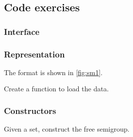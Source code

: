 \subsection{Code exercises}

\subsubsection*{Interface}


\subsubsection*{Representation}

The format is shown in \cref{fig:sm1}.



\begin{gradedexercise}
  \label{ex:TestFiniteSemigroupRepresentation}
  Create a function to load the data.



\end{gradedexercise}

\subsubsection*{Constructors}

\begin{gradedexercise}
  \label{ex:FiniteSemigroupRepresentation}
  Given a set, construct the free semigroup.

\end{gradedexercise}
